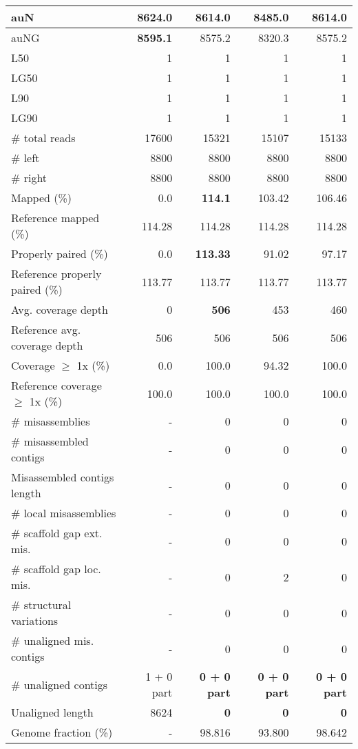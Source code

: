 \documentclass[12pt,a4paper]{article}
\begin{document}
\begin{table}[ht]
\begin{center}
\begin{tabular}{|l*{4}{|r}|}
auN & {\bf 8624.0} & 8614.0 & 8485.0 & 8614.0 \\ \hline
auNG & {\bf 8595.1} & 8575.2 & 8320.3 & 8575.2 \\ \hline
L50 & 1 & 1 & 1 & 1 \\ \hline
LG50 & 1 & 1 & 1 & 1 \\ \hline
L90 & 1 & 1 & 1 & 1 \\ \hline
LG90 & 1 & 1 & 1 & 1 \\ \hline
\# total reads & 17600 & 15321 & 15107 & 15133 \\ \hline
\# left & 8800 & 8800 & 8800 & 8800 \\ \hline
\# right & 8800 & 8800 & 8800 & 8800 \\ \hline
Mapped (\%) & 0.0 & {\bf 114.1} & 103.42 & 106.46 \\ \hline
Reference mapped (\%) & 114.28 & 114.28 & 114.28 & 114.28 \\ \hline
Properly paired (\%) & 0.0 & {\bf 113.33} & 91.02 & 97.17 \\ \hline
Reference properly paired (\%) & 113.77 & 113.77 & 113.77 & 113.77 \\ \hline
Avg. coverage depth & 0 & {\bf 506} & 453 & 460 \\ \hline
Reference avg. coverage depth & 506 & 506 & 506 & 506 \\ \hline
Coverage $\geq$ 1x (\%) & 0.0 & 100.0 & 94.32 & 100.0 \\ \hline
Reference coverage $\geq$ 1x (\%) & 100.0 & 100.0 & 100.0 & 100.0 \\ \hline
\# misassemblies & - & 0 & 0 & 0 \\ \hline
\# misassembled contigs & - & 0 & 0 & 0 \\ \hline
Misassembled contigs length & - & 0 & 0 & 0 \\ \hline
\# local misassemblies & - & 0 & 0 & 0 \\ \hline
\# scaffold gap ext. mis. & - & 0 & 0 & 0 \\ \hline
\# scaffold gap loc. mis. & - & 0 & 2 & 0 \\ \hline
\# structural variations & - & 0 & 0 & 0 \\ \hline
\# unaligned mis. contigs & - & 0 & 0 & 0 \\ \hline
\# unaligned contigs & 1 + 0 part & {\bf 0 + 0 part} & {\bf 0 + 0 part} & {\bf 0 + 0 part} \\ \hline
Unaligned length & 8624 & {\bf 0} & {\bf 0} & {\bf 0} \\ \hline
Genome fraction (\%) & - & 98.816 & 93.800 & 98.642 \\ \hline

\end{tabular}
\end{center}
\end{table}
\end{document}
